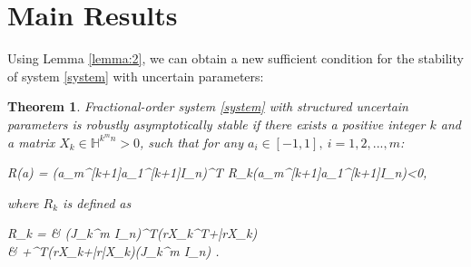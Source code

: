 \documentclass[]{interact}
\theoremstyle{plain}%
\newtheorem{theorem}{Theorem}[section]
\theoremstyle{definition}
\theoremstyle{remark}
\begin{document}
\section{Main Results}
Using Lemma \ref{lemma:2}, we can obtain a new sufficient condition for the stability of system \eqref{system} with uncertain parameters:
\begin{theorem}\label{theorem:1}
	Fractional-order system \eqref{system} with structured uncertain parameters is robustly asymptotically stable if there exists a positive integer $k$ and a matrix $X_k \in \mathbb{H}^{k^mn}>0$, such that for any $a_i \in [-1,1], \ i=1,2,...,m$:
	\begin{flalign} \label{R(a)_definition}
	R(a) = (a_m^{[k+1]}\otimes \cdots \otimes a_1^{[k+1]}\otimes I_n)^T R_k(a_m^{[k+1]}\otimes \cdots \otimes a_1^{[k+1]}\otimes I_n)<0,
	\end{flalign}
	where $R_k$ is defined as
	\begin{flalign}
	R_k = & (J_k^{m\otimes} \otimes I_n)^T(rX_k^T+\bar{r}X_k)\left[ J_k^{m\otimes}\otimes A_0^T+\sum_{i=1}^{m}(\hat{J_k}^{(m-i)\otimes}\otimes\check{J_k}\otimes\hat{J_k}^{(i-1)\otimes}\otimes A_i^T )\right]   \nonumber \\
	& +\left[ J_k^{m\otimes}\otimes A_0^T+\sum_{i=1}^{m}(\hat{J_k}^{(m-i)\otimes}\otimes\check{J_k}\otimes\hat{J_k}^{(i-1)\otimes}\otimes A_i^T )\right] ^T(rX_k+\bar{r}\bar{X}_k)(J_k^{m\otimes} \otimes I_n) \label{Rk}.
	\end{flalign}
\end{theorem}
\end{document}
